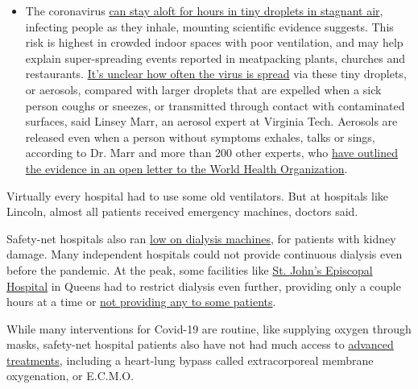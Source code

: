 \begin{itemize}
  \begin{itemize}
  \tightlist
  \item
    The coronavirus
    \href{https://www.nytimes.com/2020/07/04/health/239-experts-with-one-big-claim-the-coronavirus-is-airborne.html?action=click\&pgtype=Article\&state=default\&region=MAIN_CONTENT_3\&context=storylines_faq}{can
    stay aloft for hours in tiny droplets in stagnant air}, infecting
    people as they inhale, mounting scientific evidence suggests. This
    risk is highest in crowded indoor spaces with poor ventilation, and
    may help explain super-spreading events reported in meatpacking
    plants, churches and restaurants.
    \href{https://www.nytimes.com/2020/07/06/health/coronavirus-airborne-aerosols.html?action=click\&pgtype=Article\&state=default\&region=MAIN_CONTENT_3\&context=storylines_faq}{It's
    unclear how often the virus is spread} via these tiny droplets, or
    aerosols, compared with larger droplets that are expelled when a
    sick person coughs or sneezes, or transmitted through contact with
    contaminated surfaces, said Linsey Marr, an aerosol expert at
    Virginia Tech. Aerosols are released even when a person without
    symptoms exhales, talks or sings, according to Dr. Marr and more
    than 200 other experts, who
    \href{https://academic.oup.com/cid/article/doi/10.1093/cid/ciaa939/5867798}{have
    outlined the evidence in an open letter to the World Health
    Organization}.
  \end{itemize}
\end{itemize}

Virtually every hospital had to use some old ventilators. But at
hospitals like Lincoln, almost all patients received emergency machines,
doctors said.

Safety-net hospitals also ran
\href{https://www.nytimes.com/2020/04/18/health/kidney-dialysis-coronavirus.html}{low
on dialysis machines}, for patients with kidney damage. Many independent
hospitals could not provide continuous dialysis even before the
pandemic. At the peak, some facilities like
\href{https://www.nytimes.com/video/us/100000007097093/coronavirus-st-johns-hospital-far-rockaway.html}{St.
John's Episcopal Hospital} in Queens had to restrict dialysis even
further, providing only a couple hours at a time or
\href{https://www.nytimes.com/2020/05/01/health/coronavirus-dialysis-death.html}{not
providing any to some patients}.

While many interventions for Covid-19 are routine, like supplying oxygen
through masks, safety-net hospital patients also have not had much
access to
\href{https://www.nytimes.com/2020/04/26/health/coronavirus-patient-ventilator.html}{advanced
treatments}, including a heart-lung bypass called extracorporeal
membrane oxygenation, or E.C.M.O.

